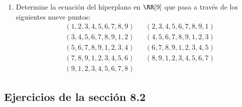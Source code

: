 \begin{enumerate}[resume]
\begin{enumerate}[label=\alph*)]
        \item Determine la ecuación del hiperplano en $\RR[9]$ que pasa a través de los siguientes nueve puntos:
        \begin{align*}
            & (1, 2, 3, 4, 5, 6, 7, 8, 9) && (2, 3, 4, 5, 6, 7, 8, 9, 1) \\
            & (3, 4, 5, 6, 7, 8, 9, 1, 2) && (4, 5, 6, 7, 8, 9, 1, 2, 3) \\
            & (5, 6, 7, 8, 9, 1, 2, 3, 4) && (6, 7, 8, 9, 1, 2, 3, 4, 5) \\
            & (7, 8, 9, 1, 2, 3, 4, 5, 6) && (8, 9, 1, 2, 3, 4, 5, 6, 7) \\
            & (9, 1, 2, 3, 4, 5, 6, 7, 8) &&
        \end{align*}
    \end{enumerate}
\end{enumerate}

\subsection*{Ejercicios de la sección 8.2}

